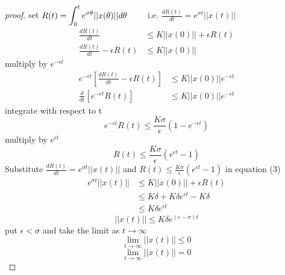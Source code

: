 \documentclass[]{article}
\begin{document}
\begin{proof}[proof]
set $\displaystyle R(t) = \int_{0}^{t} e^{\sigma \theta} ||x(\theta)|| d \theta \quad\quad$ i.e. $\displaystyle \frac{dR(t)}{dt} = e^{\sigma t} ||x(t)||$
\begin{align*}
    \frac{dR(t)}{dt}  &\leq K ||x(0)|| + \epsilon R(t) \tag{3}
    \\
    \frac{dR(t)}{dt}  - \epsilon R(t) &\leq K ||x(0)||
\end{align*}
multiply by $e^{- \epsilon t}$
\begin{align*}
    e^{- \epsilon t} \left[\frac{dR(t)}{dt}  - \epsilon R(t)\right] &\leq K ||x(0)|| e^{- \epsilon t}
    \\
    \frac{d}{dt}\left[ e^{- \epsilon t} R(t)\right] &\leq K ||x(0)|| e^{- \epsilon t}
\end{align*}
integrate with respect to t 
\[
e^{- \epsilon t} R(t) \leq \frac{K \sigma}{\epsilon}  (1- e^{- \epsilon t})
\]
multiply by $e^{\epsilon t}$
\[
R(t) \leq \frac{K \sigma}{\epsilon}  (e^{\epsilon t} - 1)
\]
Substitute $\displaystyle \frac{dR(t)}{dt} = e^{\sigma t} ||x(t)||$ and $\displaystyle R(t) \leq \frac{K \sigma}{\epsilon}  (e^{\epsilon t} - 1)$ in equation (3)
\begin{align*}
    e^{\sigma t}||x(t)|| &\leq K||x(0)|| + \epsilon R(t)
                        \\
                        &\leq K \delta + K \delta e^{\epsilon t} - K \delta
                        \\
                        &\leq K \delta e^{\epsilon t}
\end{align*}
\[
||x(t)|| \leq K \delta e^{(\epsilon-\sigma) t}
\]
put $\epsilon < \sigma$ and take the limit as $t \to \infty$
\[
\lim_{t \to \infty} ||x(t)|| \leq 0
\]
\[
\lim_{t \to \infty} ||x(t)|| = 0
\]
\end{proof}
\end{document}
